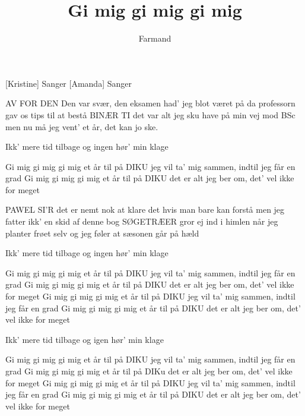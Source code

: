 \documentclass[a4paper,11pt]{article}
\title{Gi mig gi mig gi mig}
\author{Farmand}
\begin{document}
\maketitle

\begin{roles}  
[Kristine] Sanger
[Amanda] Sanger
\end{roles}

\begin{song}
 AV FOR DEN
 Den var svær, den eksamen
had' jeg blot været på
da professorn gav os tips til at bestå
 BINÆR TI
 det var alt jeg sku have
på min vej mod BSc
men nu må jeg vent' et år, det kan jo ske.

 Ikk' mere tid tilbage
og ingen hør' min klage

 Gi mig gi mig gi mig et år til på DIKU
jeg vil ta' mig sammen, indtil jeg får en grad
Gi mig gi mig gi mig et år til på DIKU
det er alt jeg ber om, det' vel ikke for meget

 PAWEL SI'R
 det er nemt nok at klare det
hvis man bare kan forstå
men jeg fatter ikk' en skid af denne bog
 SØGETRÆER
 gror ej ind i himlen
når jeg planter frøet selv
og jeg føler at sæsonen går på hæld

 Ikk' mere tid tilbage
og ingen hør' min klage

 Gi mig gi mig gi mig et år til på DIKU
jeg vil ta' mig sammen, indtil jeg får en grad
Gi mig gi mig gi mig et år til på DIKU
det er alt jeg ber om, det' vel ikke for meget
Gi mig gi mig gi mig et år til på DIKU
jeg vil ta' mig sammen, indtil jeg får en grad
Gi mig gi mig gi mig et år til på DIKU
det er alt jeg ber om, det' vel ikke for meget

 Ikk' mere tid tilbage
og igen hør' min klage

 Gi mig gi mig gi mig et år til på DIKU
jeg vil ta' mig sammen, indtil jeg får en grad
Gi mig gi mig gi mig et år til på DIKu
det er alt jeg ber om, det' vel ikke for meget
Gi mig gi mig gi mig et år til på DIKU
jeg vil ta' mig sammen, indtil jeg får en grad
Gi mig gi mig gi mig et år til på DIKU
det er alt jeg ber om, det' vel ikke for meget
\end{song}
\end{document}
